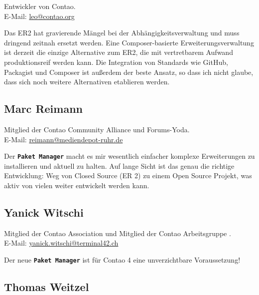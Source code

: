 \documentclass[
paper=a4,
draft=false,%
fontsize=10pt%
]{scrartcl}
\newcommand{\packageManager}{\textbf{\texttt{Paket Manager}}}
\begin{document}
Entwickler von Contao.\\
E-Mail: \href{mailto:leo@contao.org}{leo@contao.org}

\begin{emquote}{}
Das ER2 hat gravierende Mängel bei der Abhängigkeitsverwaltung und muss dringend zeitnah ersetzt werden. Eine Composer-basierte Erweiterungsverwaltung ist derzeit die einzige Alternative zum ER2, die mit vertretbarem Aufwand produktionsreif werden kann. Die Integration von Standards wie GitHub, Packagist und Composer ist außerdem der beste Ansatz, so dass ich nicht glaube, dass sich noch weitere Alternativen etablieren werden.
\end{emquote}

\subsection*{Marc  Reimann}

Mitglied der Contao Community Alliance und Forums-Yoda.\\
E-Mail: \href{mailto:reimann@mediendepot-ruhr.de}{reimann@mediendepot-ruhr.de}

\begin{emquote}{}
Der \packageManager{} macht es mir wesentlich einfacher komplexe Erweiterungen zu installieren und aktuell zu halten. Auf lange Sicht ist das genau die richtige Entwicklung: Weg von Closed Source (ER 2) zu einem Open Source Projekt, was aktiv von vielen weiter entwickelt werden kann.
\end{emquote}

\subsection*{Yanick  Witschi}

Mitglied der Contao Association und Mitglied der Contao Arbeitsgruppe .\\
E-Mail: \href{mailto:yanick.witschi@terminal42.ch}{yanick.witschi@terminal42.ch}

\begin{emquote}{}
Der neue \packageManager{} ist für Contao 4 eine unverzichtbare Voraussetzung!
\end{emquote}

\pagebreak

\subsection*{Thomas  Weitzel}
\end{document}
